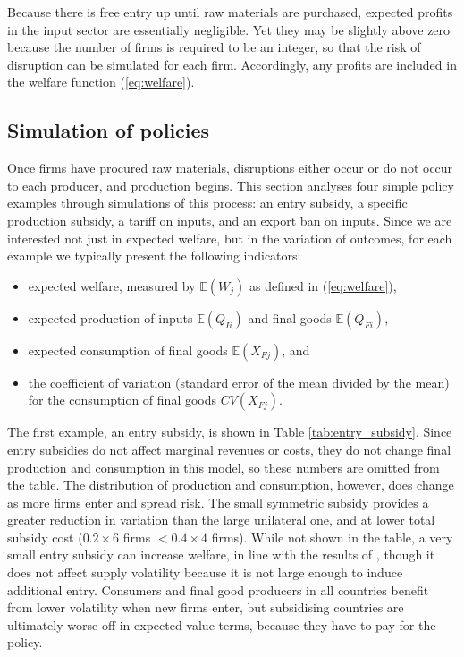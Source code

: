 \documentclass{article}
\begin{document}
Because there is free entry up until raw materials are purchased, expected profits in the input sector are essentially negligible. Yet they may be slightly above zero because the number of firms is required to be an integer, so that the risk of disruption can be simulated for each firm. Accordingly, any profits are included in the welfare function (\ref{eq:welfare}).

\subsection{Simulation of policies}

Once firms have procured raw materials, disruptions either occur or do not occur to each producer, and production begins. This section analyses four simple policy examples through simulations of this process: an entry subsidy, a specific production subsidy, a tariff on inputs, and an export ban on inputs. Since we are interested not just in expected welfare, but in the variation of outcomes, for each example we typically present the following indicators:
\begin{itemize}
    \item expected welfare, measured by $\mathbb{E} (W_{j})$ as defined in (\ref{eq:welfare}), 
    \item expected production of inputs $\mathbb{E} (Q_{Ii})$ and final goods $\mathbb{E} (Q_{Fi})$, 
    \item expected consumption of final goods $\mathbb{E} (X_{Fj})$, and
    \item the coefficient of variation (standard error of the mean divided by the mean) for the consumption of final goods $CV (X_{Fj})$.
\end{itemize}

The first example, an entry subsidy, is shown in Table \ref{tab:entry_subsidy}. Since entry subsidies do not affect marginal revenues or costs, they do not change final production and consumption in this model, so these numbers are omitted from the table. The distribution of production and consumption, however, does change as more firms enter and spread risk. The small symmetric subsidy provides a greater reduction in variation than the large unilateral one, and at lower total subsidy cost ($0.2 \times 6$ firms $< 0.4 \times 4$ firms). While not shown in the table, a very small entry subsidy can increase welfare, in line with the results of \textcite{bagwell_trade_2018}, though it does not affect supply volatility because it is not large enough to induce additional entry. Consumers and final good producers in all countries benefit from lower volatility when new firms enter, but subsidising countries are ultimately worse off in expected value terms, because they have to pay for the policy.
\end{document}

